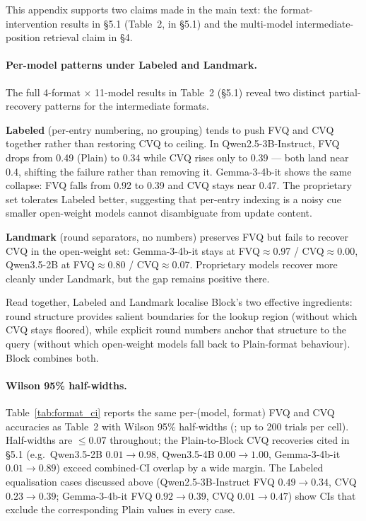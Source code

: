 \documentclass[letterpaper]{article} %
\begin{document}
This appendix supports two claims made in the main text:
the format-intervention results in \S5.1
(Table~2, in
\S5.1) and the multi-model
intermediate-position retrieval claim in \S4.

\paragraph{Per-model patterns under Labeled and Landmark.}
The full 4-format $\times$ 11-model results in
Table~2 (\S5.1) reveal two
distinct partial-recovery patterns for the intermediate formats.

\textbf{Labeled} (per-entry numbering, no grouping) tends to push
FVQ and CVQ together rather than restoring CVQ to ceiling. In
Qwen2.5-3B-Instruct, FVQ drops from 0.49 (Plain) to 0.34 while CVQ
rises only to 0.39 --- both land near 0.4, shifting the failure
rather than removing it. Gemma-3-4b-it shows the same collapse:
FVQ falls from 0.92 to 0.39 and CVQ stays near 0.47. The
proprietary set tolerates Labeled better, suggesting that
per-entry indexing is a noisy cue smaller open-weight models cannot
disambiguate from update content.

\textbf{Landmark} (round separators, no numbers) preserves FVQ but
fails to recover CVQ in the open-weight set: Gemma-3-4b-it stays at
FVQ$\approx$0.97 / CVQ$\approx$0.00, Qwen3.5-2B at FVQ$\approx$0.80
/ CVQ$\approx$0.07. Proprietary models recover more cleanly under
Landmark, but the gap remains positive there.

Read together, Labeled and Landmark localise Block's two effective
ingredients: round structure provides salient boundaries for the
lookup region (without which CVQ stays floored), while explicit
round numbers anchor that structure to the query (without which
open-weight models fall back to Plain-format behaviour). Block
combines both.

\paragraph{Wilson 95\% half-widths.}
Table~\ref{tab:format_ci} reports the same per-(model, format) FVQ
and CVQ accuracies as Table~2 with Wilson 95\%
half-widths (\citealp{wilson1927}; up to 200 trials per cell).
Half-widths are $\leq 0.07$ throughout; the Plain-to-Block CVQ
recoveries cited in \S5.1 (e.g.\ Qwen3.5-2B
$0.01 \to 0.98$, Qwen3.5-4B $0.00 \to 1.00$, Gemma-3-4b-it
$0.01 \to 0.89$) exceed combined-CI overlap by a wide margin. The
Labeled equalisation cases discussed above
(Qwen2.5-3B-Instruct FVQ $0.49 \to 0.34$, CVQ $0.23 \to 0.39$;
Gemma-3-4b-it FVQ $0.92 \to 0.39$, CVQ $0.01 \to 0.47$) show CIs
that exclude the corresponding Plain values in every case.
\end{document}
